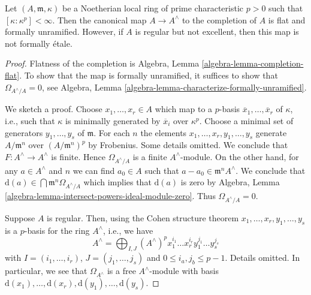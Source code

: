 \begin{lemma}
\label{lemma-completion-etale}
Let $(A, \mathfrak m, \kappa)$ be a Noetherian local ring of prime
characteristic $p > 0$ such that $[\kappa : \kappa^p] < \infty$.
Then the  canonical map  $A \to A^\wedge$ to the completion of $A$
is flat and formally unramified. However, if $A$ is regular but not
excellent, then this map is not formally \'etale.
\end{lemma}

\begin{proof}
Flatness of the completion is
Algebra, Lemma \ref{algebra-lemma-completion-flat}.
To show that the map is formally unramified, it
suffices to show that $\Omega_{A^\wedge/A} = 0$, see
Algebra, Lemma \ref{algebra-lemma-characterize-formally-unramified}.

\medskip\noindent
We sketch a proof. Choose $x_1, \ldots, x_r \in A$ which map to a $p$-basis
$\overline{x}_1, \ldots, \overline{x}_r$ of $\kappa$, i.e.,
such that $\kappa$ is minimally generated by $\overline{x}_i$ over $\kappa^p$.
Choose a minimal set of generators $y_1, \ldots, y_s$ of $\mathfrak m$.
For each $n$ the elements $x_1, \ldots, x_r, y_1, \ldots, y_s$ generate
$A/\mathfrak m^n$ over $(A/\mathfrak m^n)^p$ by Frobenius.
Some details omitted. We conclude that $F : A^\wedge \to A^\wedge$
is finite. Hence $\Omega_{A^\wedge/A}$ is a finite $A^\wedge$-module.
On the other hand, for any $a \in A^\wedge$ and $n$ we can find
$a_0 \in A$ such that $a - a_0 \in \mathfrak m^nA^\wedge$.
We conclude that $\text{d}(a) \in \bigcap \mathfrak m^n \Omega_{A^\wedge/A}$
which implies that $\text{d}(a)$ is zero by
Algebra, Lemma \ref{algebra-lemma-intersect-powers-ideal-module-zero}.
Thus $\Omega_{A^\wedge/A} = 0$.

\medskip\noindent
Suppose $A$ is regular. Then, using the Cohen structure theorem
$x_1, \ldots, x_r, y_1, \ldots, y_s$ is a $p$-basis for the ring
$A^\wedge$, i.e., we have
$$
A^\wedge = \bigoplus\nolimits_{I, J} (A^\wedge)^p
x_1^{i_1} \ldots x_r^{i_r} y_1^{j_1} \ldots y_s^{j_s}
$$
with $I = (i_1, \ldots, i_r)$, $J = (j_1, \ldots, j_s)$ and
$0 \leq i_a, j_b \leq p - 1$. Details omitted. In particular, we see that
$\Omega_{A^\wedge}$ is a free $A^\wedge$-module with basis
$\text{d}(x_1), \ldots, \text{d}(x_r), \text{d}(y_1), \ldots, \text{d}(y_s)$.


\end{proof}
